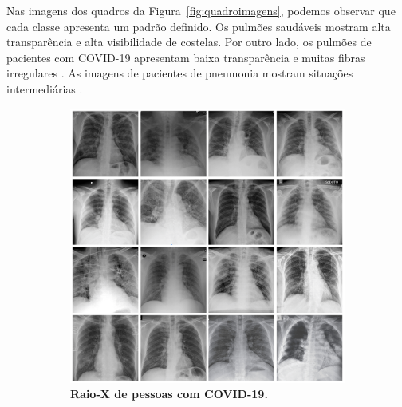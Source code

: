 \documentclass[
12pt,        %
oneside,     %
a4paper,     %
english,       %
brazil        %
%
%
]{ppgca}
\begin{document}
Nas imagens dos quadros da Figura~\ref{fig:quadroimagens}, podemos observar que cada classe apresenta um padrão definido. Os pulmões saudáveis mostram alta transparência e alta visibilidade de costelas. Por outro lado, os pulmões de pacientes com COVID-19 apresentam baixa transparência e muitas fibras irregulares \cite{guan2020}. As imagens de pacientes de pneumonia mostram situações intermediárias \cite{ARAUJO-FILHO2020}.

\begin{figure}[H]
\centering
    \begin{subfigure}[b]{0.49\textwidth}
        \includegraphics[width=\textwidth]{quadrocovid.png}
        \centering
        \caption{\textbf{Raio-X de pessoas com COVID-19.}}
        \label{fig:quadrocovid}
    \end{subfigure}
    \hfill
    \begin{subfigure}[b]{0.49\textwidth}

\end{subfigure}
\end{figure}
\end{document}
